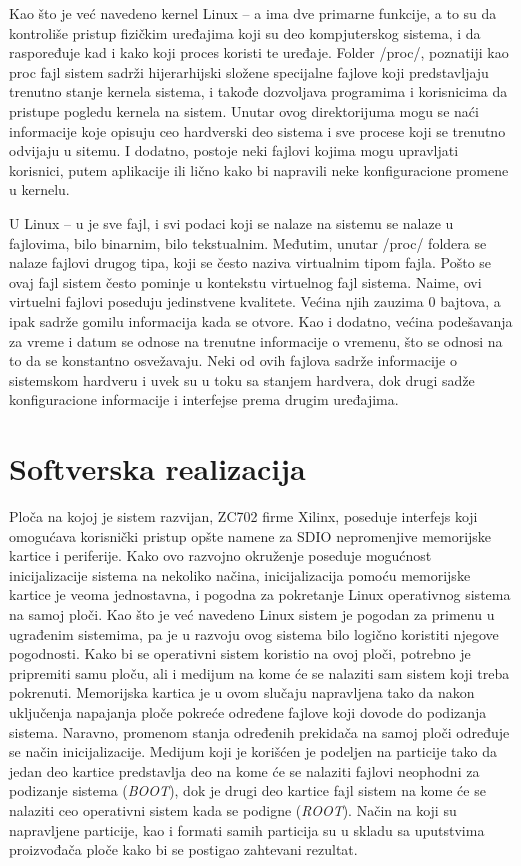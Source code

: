 \documentclass[a4paper, 12pt, diplomski]{etf}
\begin{document}
	Kao što je već navedeno kernel Linux – a ima dve primarne funkcije, a to su da kontroliše pristup fizičkim uređajima koji su deo kompjuterskog sistema, i da raspoređuje kad i kako koji proces koristi te uređaje. Folder /proc/, poznatiji kao proc fajl sistem sadrži hijerarhijski složene specijalne fajlove koji predstavljaju trenutno stanje kernela sistema, i takođe dozvoljava programima i korisnicima da pristupe pogledu kernela na sistem. Unutar ovog direktorijuma mogu se naći informacije koje opisuju ceo hardverski deo sistema i sve procese koji se trenutno odvijaju u sitemu. I dodatno, postoje neki fajlovi kojima mogu upravljati korisnici, putem aplikacije ili lično kako bi napravili neke konfiguracione promene u kernelu.

	U Linux – u je sve fajl, i svi podaci koji se nalaze na sistemu se nalaze u fajlovima, bilo binarnim, bilo tekstualnim. Međutim, unutar /proc/ foldera se nalaze fajlovi drugog tipa, koji se često naziva virtualnim tipom fajla. Pošto se ovaj fajl sistem često pominje u kontekstu virtuelnog fajl sistema. Naime, ovi virtuelni fajlovi poseduju jedinstvene kvalitete. Većina njih zauzima 0 bajtova, a ipak sadrže gomilu informacija kada se otvore. Kao i dodatno, većina podešavanja za vreme i datum se odnose na trenutne informacije o vremenu, što se odnosi na to da se konstantno osvežavaju. Neki od ovih fajlova sadrže informacije o sistemskom hardveru i uvek su u toku sa stanjem hardvera, dok drugi sadže konfiguracione informacije i interfejse prema drugim uređajima.

	\newpage

	\chapter{Softverska realizacija}
	Ploča na kojoj je sistem razvijan, ZC702 firme Xilinx, poseduje interfejs koji omogućava korisnički pristup opšte namene za SDIO nepromenjive memorijske kartice i periferije. Kako ovo razvojno okruženje poseduje mogućnost inicijalizacije sistema na nekoliko načina, inicijalizacija pomoću memorijske kartice je veoma jednostavna, i pogodna za pokretanje Linux operativnog sistema na samoj ploči. Kao što je već navedeno Linux sistem je pogodan za primenu u ugrađenim sistemima, pa je u razvoju ovog sistema bilo logično koristiti njegove pogodnosti. Kako bi se operativni sistem koristio na ovoj ploči, potrebno je pripremiti samu ploču, ali i medijum na kome će se nalaziti sam sistem koji treba pokrenuti. Memorijska kartica je u ovom slučaju napravljena tako da nakon uključenja napajanja ploče pokreće određene fajlove koji dovode do podizanja sistema. Naravno, promenom stanja određenih prekidača na samoj ploči određuje se način inicijalizacije. Medijum koji je korišćen je podeljen na particije tako da jedan deo kartice predstavlja deo na kome će se nalaziti fajlovi neophodni za podizanje sistema (\textit{BOOT}), dok je drugi deo kartice fajl sistem na kome će se nalaziti ceo operativni sistem kada se podigne (\textit{ROOT}). Način na koji su napravljene particije, kao i formati samih particija su u skladu sa uputstvima proizvođača ploče kako bi se postigao zahtevani rezultat.
\end{document}
